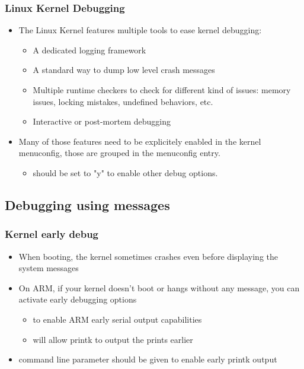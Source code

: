 \begin{frame}
  \frametitle{Linux Kernel Debugging}
  \begin{itemize}
    \item The Linux Kernel features multiple tools to ease kernel debugging:
    \begin{itemize}
      \item A dedicated logging framework
      \item A standard way to dump low level crash messages
      \item Multiple runtime checkers to check for different kind of issues:
      memory issues, locking mistakes, undefined behaviors, etc.
      \item Interactive or post-mortem debugging
    \end{itemize}
    \item Many of those features need to be explicitely enabled in the kernel
    menuconfig, those are grouped in the   menuconfig entry.
    \begin{itemize}
    \item {} should be set to "y" to enable other
          debug options.
    \end{itemize}
  \end{itemize}
\end{frame}

\subsection{Debugging using messages}



\begin{frame}
  \frametitle{Kernel early debug}
  \begin{itemize}
  \item When booting, the kernel sometimes crashes even before displaying
    the system messages
  \item On ARM, if your kernel doesn't boot or hangs without any
    message, you can activate early debugging options
  \begin{itemize}
    \item {} to enable ARM early serial output
      capabilities
    \item {} will allow printk to output the
      prints earlier
  \end{itemize}
  \item {} command line parameter should be given to enable
    early printk output
  \end{itemize}
\end{frame}

